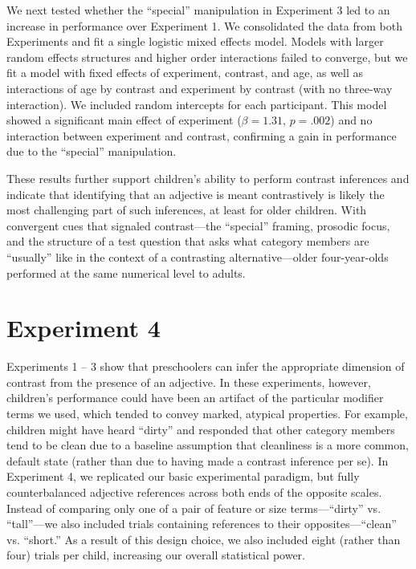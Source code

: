 \documentclass[man]{apa2}
\begin{document}
We next tested whether the ``special'' manipulation in Experiment 3 led to an increase in performance over Experiment 1. We consolidated the data from both Experiments and fit a single logistic mixed effects model. Models with larger random effects structures and higher order interactions failed to converge, but we fit a model with fixed effects of experiment, contrast, and age, as well as interactions of age by contrast and experiment by contrast (with no three-way interaction). We included random intercepts for each participant. This model showed a significant main effect of experiment ($\beta = 1.31$, $p = .002$) and no interaction between experiment and contrast, confirming a gain in performance due to the ``special'' manipulation. 

These results further support children's ability to perform contrast inferences and indicate that identifying that an adjective is meant contrastively is likely the most challenging part of such inferences, at least for older children. With convergent cues that signaled contrast---the ``special'' framing, prosodic focus, and the structure of a test question that asks what category members are ``usually'' like in the context of a contrasting alternative---older four-year-olds performed at the same numerical level to adults.

\section{Experiment 4} 

Experiments 1 -- 3 show that preschoolers can infer the appropriate dimension of contrast from the presence of an adjective. In these experiments, however, children's performance could have been an artifact of the particular modifier terms we used, which tended to convey marked, atypical properties. For example, children might have heard ``dirty'' and responded that other category members tend to be clean due to a baseline assumption that cleanliness is a more common, default state (rather than due to having made a contrast inference per se). In Experiment 4, we replicated our basic experimental paradigm, but fully counterbalanced adjective references across both ends of the opposite scales. Instead of comparing only one of a pair of feature or size terms---``dirty'' vs. ``tall''---we also included trials containing references to their opposites---``clean'' vs. ``short.''  As a result of this design choice, we also included eight (rather than four) trials per child, increasing our overall statistical power.
\end{document}
